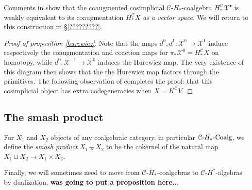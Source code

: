\documentclass[11pt]{amsart}
\theoremstyle{plain}
\theoremstyle{definition}
\renewcommand{\to}{\longrightarrow}
\newcommand{\calX}{\mathcal{X}}
\newcommand{\calC}{\mathcal{C}}
\newcommand{\calx}{\mathcal{X}}
\newcommand{\calc}{\mathcal{C}}
\theoremstyle{plain}
\newcommand{\HCoalg}{\textup{-$H_*$-Coalg}}
\newcommand{\smashprod}{\barwedge}%
\begin{document}
\begin{CPiAlgs and CHalgs}
Comments in \cite[\S4]{BlumRiehlResolutions.pdf}  show that the coaugmented cosimplicial $\calc$-$H_*$-coalgebra $H_*^{\calc}\calX^\bullet$  is weakly equivalent to its coaugmentation $H_*^{\calc}X$ \emph{as a vector space}. We will return to this construction in \S\ref{?????????}.

\begin{proof}[Proof of proposition \ref{hurewicz}]
Note that the maps $d^0,d^1:\calX^{0}\to\calX^{1}$ induce respectively the coaugmentation and coaction maps for $\pi_*\calx^{0}=H_*^{\calc}X$ on homotopy, while $d^0:\calX^{-1}\to\calX^{0}$ induces the Hurewicz map. The very existence of this diagram then shows that the the Hurewicz map factors through the primitives. The following observation of \cite[\S4]{BlumRiehlResolutions.pdf} completes the proof: that this cosimplicial object has extra codegeneracies  when $X=K^\calc V$.
\end{proof}

\subsection{The smash product}\label{subseq:The smash product}
For $X_1$ and $X_2$ objects of any coalgebraic category, in particular $\calC\HCoalg$, we define the \emph{smash product} $X_1\smashprod X_2$ to be the cokernel of the natural map $X_1\sqcup X_2\to X_1\times X_2$. 

{\tiny Finally, we will sometimes need to move from $\calc$-$H_*$-coalgebras to $\calc$-$H^*$-algebras by dualization. \textbf{was going to put a proposition here...}}


\end{CPiAlgs and CHalgs}
\end{document}
